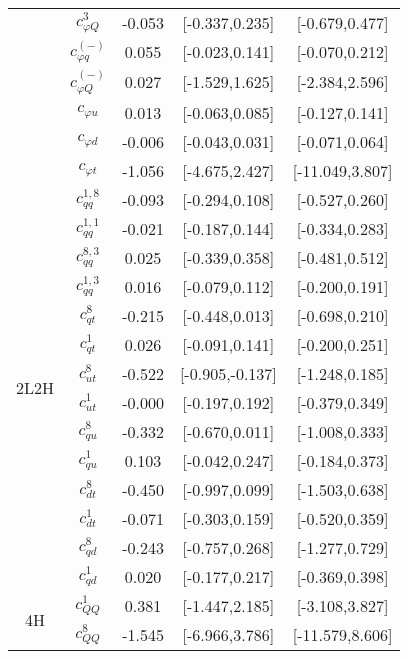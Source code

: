 \documentclass{article}
\begin{document}
\begin{table}[H]
\begin{tabular}{|c|c|c|c|c|}
 & $c_{\varphi Q}^{3}$ & -0.053 & [-0.337,0.235] & [-0.679,0.477]  \\ \cline{2-5}
 & $c_{\varphi q}^{(-)}$ & 0.055 & [-0.023,0.141] & [-0.070,0.212]  \\ \cline{2-5}
 & $c_{\varphi Q}^{(-)}$ & 0.027 & [-1.529,1.625] & [-2.384,2.596]  \\ \cline{2-5}
 & $c_{\varphi u}$ & 0.013 & [-0.063,0.085] & [-0.127,0.141]  \\ \cline{2-5}
 & $c_{\varphi d}$ & -0.006 & [-0.043,0.031] & [-0.071,0.064]  \\ \cline{2-5}
 & $c_{\varphi t}$ & -1.056 & [-4.675,2.427] & [-11.049,3.807]  \\ \cline{2-5}
\hline
\multirow{14}{*}{2L2H}
 & $c_{qq}^{1,8}$ & -0.093 & [-0.294,0.108] & [-0.527,0.260]  \\ \cline{2-5}
 & $c_{qq}^{1,1}$ & -0.021 & [-0.187,0.144] & [-0.334,0.283]  \\ \cline{2-5}
 & $c_{qq}^{8,3}$ & 0.025 & [-0.339,0.358] & [-0.481,0.512]  \\ \cline{2-5}
 & $c_{qq}^{1,3}$ & 0.016 & [-0.079,0.112] & [-0.200,0.191]  \\ \cline{2-5}
 & $c_{qt}^{8}$ & -0.215 & [-0.448,0.013] & [-0.698,0.210]  \\ \cline{2-5}
 & $c_{qt}^{1}$ & 0.026 & [-0.091,0.141] & [-0.200,0.251]  \\ \cline{2-5}
 & $c_{ut}^{8}$ & -0.522 & [-0.905,-0.137] & [-1.248,0.185]  \\ \cline{2-5}
 & $c_{ut}^{1}$ & -0.000 & [-0.197,0.192] & [-0.379,0.349]  \\ \cline{2-5}
 & $c_{qu}^{8}$ & -0.332 & [-0.670,0.011] & [-1.008,0.333]  \\ \cline{2-5}
 & $c_{qu}^{1}$ & 0.103 & [-0.042,0.247] & [-0.184,0.373]  \\ \cline{2-5}
 & $c_{dt}^{8}$ & -0.450 & [-0.997,0.099] & [-1.503,0.638]  \\ \cline{2-5}
 & $c_{dt}^{1}$ & -0.071 & [-0.303,0.159] & [-0.520,0.359]  \\ \cline{2-5}
 & $c_{qd}^{8}$ & -0.243 & [-0.757,0.268] & [-1.277,0.729]  \\ \cline{2-5}
 & $c_{qd}^{1}$ & 0.020 & [-0.177,0.217] & [-0.369,0.398]  \\ \cline{2-5}
\hline
\multirow{5}{*}{4H}
 & $c_{QQ}^{1}$ & 0.381 & [-1.447,2.185] & [-3.108,3.827]  \\ \cline{2-5}
 & $c_{QQ}^{8}$ & -1.545 & [-6.966,3.786] & [-11.579,8.606]  \\ \cline{2-5}

\end{tabular}
\end{table}
\end{document}

